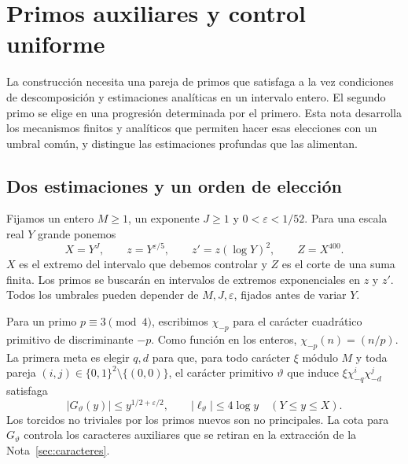\section{Primos auxiliares y control uniforme}
\label{sec:auxiliares}

La construcción necesita una pareja de primos que satisfaga a la vez
condiciones de descomposición y estimaciones analíticas en un intervalo
entero. El segundo primo se elige en una progresión determinada por el
primero. Esta nota desarrolla los mecanismos finitos y analíticos que
permiten hacer esas elecciones con un umbral común, y distingue las
estimaciones profundas que las alimentan.


\subsection{Dos estimaciones y un orden de elección}

Fijamos un entero $M\ge1$, un exponente $J\ge1$ y
$0<\varepsilon<1/52$. Para una escala real $Y$ grande ponemos
\begin{equation}
 X=Y^J,\qquad z=Y^{\varepsilon/5},\qquad
 z'=z(\log Y)^2,\qquad Z=X^{400}.
 \label{eq:aux-escalas}
\end{equation}
$X$ es el extremo del intervalo que debemos controlar y $Z$ es el
corte de una suma finita. Los primos se buscarán en intervalos de
extremos exponenciales en $z$ y $z'$. Todos los umbrales pueden
depender de $M,J,\varepsilon$, fijados antes de variar $Y$.

Para un primo $p\equiv3\pmod4$, escribimos $\chi_{-p}$ para el
carácter cuadrático primitivo de discriminante $-p$. Como función en
los enteros, $\chi_{-p}(n)=(n/p)$. La primera meta es elegir $q,d$
para que, para todo carácter $\xi$ módulo $M$ y toda pareja
$(i,j)\in\{0,1\}^2\setminus\{(0,0)\}$, el carácter primitivo
$\vartheta$ que induce $\xi\chi_{-q}^i\chi_{-d}^j$ satisfaga
\begin{equation}
 |G_\vartheta(y)|\le y^{1/2+\varepsilon/2},\qquad
 |\ell_\vartheta|\le4\log y
 \quad (Y\le y\le X).
 \label{eq:aux-meta-pareja}
\end{equation}
Los torcidos no triviales por los primos nuevos son no principales.
La cota para $G_\vartheta$ controla los caracteres auxiliares que se
retiran en la extracción de la Nota~\ref{sec:caracteres}.

